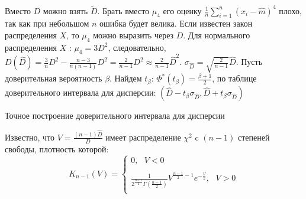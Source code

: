 \documentclass[russian, 12pt, fleqn,x11names]{article}
\begin{document}
Вместо $D$ можно взять $\tilde{D}$. Брать вместо $\mu_4$ его оценку $\frac{1}{n}\displaystyle{\sum \limits _{i=1} ^ {n} } (x_i - \hat{m})^4$ плохо, так как при небольшом $n$ ошибка будет велика. Если известен закон распределения $X$, то $\mu_4$ можно выразить через $D$. Для нормального распределения $X$ : $\mu_4 = 3D^2$, следовательно, $D(\hat{D}) = \frac{3}{n} D^2 - \frac{n - 3}{n(n-1)}D^2 = \frac{2}{n - 1}D^2 \approx \frac{2}{n - 1} \hat{D}^2 $. $\sigma_{\hat{D}} = \sqrt{\frac{2}{n - 1}} \hat{D}$. Пусть доверительная вероятность $\beta$. Найдем $t_{\beta}$: $\Phi^*(t_{\beta}) = \frac{\beta + 1}{2}$, по таблице доверительного интервала для дисперсии: $(\hat{D} - t_\beta \sigma_{\hat{D}}, \hat{D} + t_\beta \sigma_{\hat{D}})$\\
\begin{center}
$\textbf{Точное построение доверительного интервала для дисперсии}$
\end{center}
Известно, что $V = \frac{(n-1)\hat{D}}{D}$ имеет распределение $\chi^2$ c $(n-1)$ степеней свободы, плотность которой:\\
\noindent
\begin{equation*} 
K_{n - 1}(V)=
 \begin{cases}
   0 ,\ \ \  V < 0\\
	\\
   \frac{1}{  2 ^{ { \frac{n - 1}{2}  }}  \Gamma(\frac{n - 1}{2})} V^{\frac{n - 1}{2} - 1}e^{-\frac{V}{2}}    , \ \ \ V > 0\\
 \end{cases}
\end{equation*}\\
\end{document}
